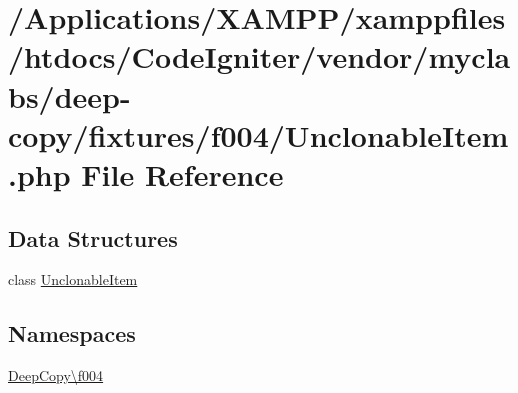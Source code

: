 \hypertarget{_unclonable_item_8php}{}\section{/\+Applications/\+X\+A\+M\+P\+P/xamppfiles/htdocs/\+Code\+Igniter/vendor/myclabs/deep-\/copy/fixtures/f004/\+Unclonable\+Item.php File Reference}
\label{_unclonable_item_8php}
\subsection*{Data Structures}
\begin{DoxyCompactItemize}
\item 
class \mbox{\hyperlink{class_deep_copy_1_1f004_1_1_unclonable_item}{Unclonable\+Item}}
\end{DoxyCompactItemize}
\subsection*{Namespaces}
\begin{DoxyCompactItemize}
\item 
 \mbox{\hyperlink{namespace_deep_copy_1_1f004}{Deep\+Copy\textbackslash{}f004}}
\end{DoxyCompactItemize}
